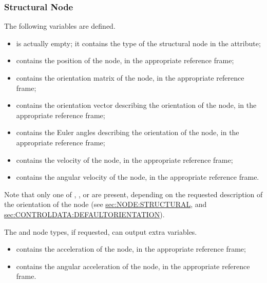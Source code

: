 \subsubsection{Structural Node}
\label{sec:NetCDF:Node:Structural Node}
The following variables are defined.
\begin{itemize}
\item {} is actually empty;
it contains the type of the structural node in the  attribute;

\item {} contains the position of the node,
in the appropriate reference frame;

\item {} contains the orientation matrix of the node,
in the appropriate reference frame;

\item {} contains the orientation vector
describing the orientation of the node, in the appropriate reference frame;

\item {} contains the Euler angles
describing the orientation of the node, in the appropriate reference frame;

\item {} contains the velocity
of the node, in the appropriate reference frame;

\item {} contains the angular velocity
of the node, in the appropriate reference frame.
\end{itemize}
Note that only one of , , or  are present,
depending on the requested description of the orientation of the node
(see
\hyperref{\kw{structural node}}{\kw{structural node}, Section~}{}{sec:NODE:STRUCTURAL},
and
\hyperref{\kw{default orientation}}{\kw{default orientation}, Section~}{}{sec:CONTROLDATA:DEFAULTORIENTATION}).

The  and  node types, if requested, can output
extra variables.
\begin{itemize}
\item {} contains the acceleration of the node,
in the appropriate reference frame;

\item {} contains the angular acceleration
of the node, in the appropriate reference frame.
\end{itemize}

